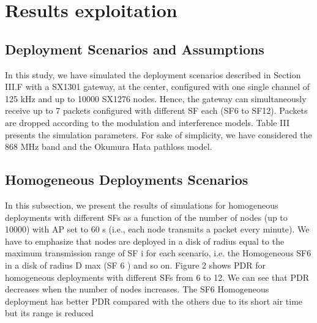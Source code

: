 \section{Results exploitation} \label{sec:Results}


\subsection{Deployment Scenarios and Assumptions}
In this study,
	we have simulated the deployment scenarios described in Section III.F with a SX1301 gateway,
	at the center,
	configured with one single channel of 125 kHz and up to 10000 SX1276 nodes.
Hence,
	the gateway can simultaneously receive up to 7 packets configured with different SF each (SF6 to SF12).
Packets are dropped according to the modulation and interference models.
Table III presents the simulation parameters.
For sake of simplicity,
	we have considered the 868 MHz band and the Okumura Hata pathloss model.
	
\subsection{Homogeneous Deployments Scenarios}

In this subsection,
	we present the results of simulations for homogeneous deployments with different SFs as a function of the number of nodes (up to 10000) with AP set to 60 s (i.e.,
	each node transmits a packet every minute).
We have to emphasize that nodes are deployed in a disk of radius equal to the maximum transmission range of SF i for each scenario,
	i.e.
the Homogeneous SF6 in a disk of radius D max (SF 6 ) and so on.
Figure 2 shows PDR for homogeneous deployments with different SFs from 6 to 12.
We can see that PDR decreases when the number of nodes increases.
The SF6 Homogeneous deployment has better PDR compared with the others due to its short air time but its range is reduced


